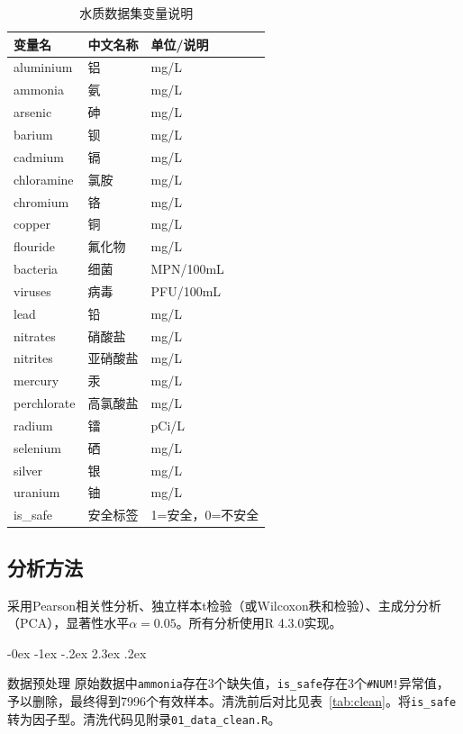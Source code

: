 \documentclass[12pt,a4paper]{ctexart}
\makeatletter
\renewcommand{\section}{\@startsection{section}{1}{\z@}%
{-0ex \@plus -1ex \@minus -.2ex}%
{2.3ex \@plus.2ex}%
{\normalfont\Large\bfseries\raggedright}}
\makeatother
\begin{document}
\begin{table}[H]
\centering
\caption{水质数据集变量说明}
\label{tab:var}
\begin{tabular}{lll}
\toprule
变量名 & 中文名称 & 单位/说明 \\
\midrule
aluminium & 铝 & mg/L \\
ammonia & 氨 & mg/L \\
arsenic & 砷 & mg/L \\
barium & 钡 & mg/L \\
cadmium & 镉 & mg/L \\
chloramine & 氯胺 & mg/L \\
chromium & 铬 & mg/L \\
copper & 铜 & mg/L \\
flouride & 氟化物 & mg/L \\
bacteria & 细菌 & MPN/100mL \\
viruses & 病毒 & PFU/100mL \\
lead & 铅 & mg/L \\
nitrates & 硝酸盐 & mg/L \\
nitrites & 亚硝酸盐 & mg/L \\
mercury & 汞 & mg/L \\
perchlorate & 高氯酸盐 & mg/L \\
radium & 镭 & pCi/L \\
selenium & 硒 & mg/L \\
silver & 银 & mg/L \\
uranium & 铀 & mg/L \\
is\_safe & 安全标签 & 1=安全，0=不安全 \\
\bottomrule
\end{tabular}
\end{table}

\subsection{分析方法}
采用Pearson相关性分析、独立样本t检验（或Wilcoxon秩和检验）、主成分分析（PCA），显著性水平$\alpha=0.05$。所有分析使用R 4.3.0实现。

\section{数据预处理}
原始数据中\texttt{ammonia}存在3个缺失值，\texttt{is\_safe}存在3个\texttt{\#NUM!}异常值，予以删除，最终得到7996个有效样本。清洗前后对比见表~\ref{tab:clean}。将\texttt{is\_safe}转为因子型。清洗代码见附录\texttt{01\_data\_clean.R}。
\end{document}
